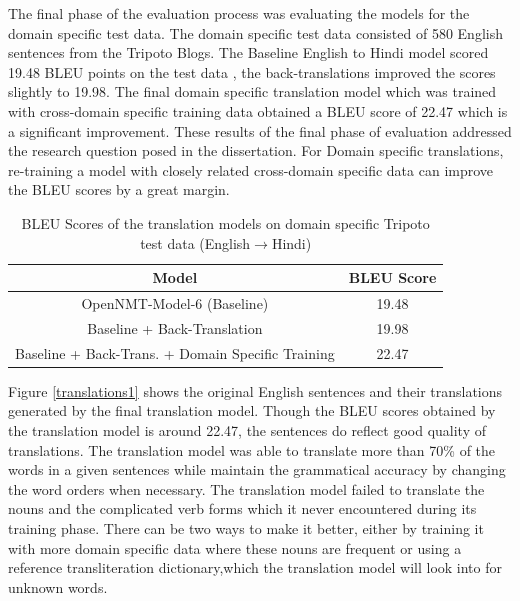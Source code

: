 The final phase of the evaluation process was evaluating the models for the domain specific test data. The domain specific test data consisted of 580 English sentences from the Tripoto Blogs. The Baseline English to Hindi model scored 19.48 BLEU points on the test data , the back-translations improved the scores slightly to 19.98. The final domain specific translation model which was trained with cross-domain specific training data obtained a BLEU score of 22.47 which is a significant improvement. These results of the final phase of evaluation addressed the research question posed in the dissertation. For Domain specific translations, re-training a model with closely related cross-domain specific data can improve the BLEU scores by a great margin. 
\begin{table}[h!]
\centering
 \begin{tabular}{ |c|c| } 
  \hline Model & BLEU Score  \\ 
  \hline  OpenNMT-Model-6 (Baseline) &   19.48\\
  Baseline + Back-Translation & 19.98\\
  Baseline + Back-Trans. + Domain Specific Training & 22.47 \\
  \hline
 \end{tabular}
\caption{BLEU Scores of the translation models on domain specific Tripoto test data (English$\rightarrow$Hindi)}
\label{bleutable3}
\end{table}

Figure \ref{translations1} shows the original English sentences and their translations generated by the final translation model. Though the BLEU scores obtained by the translation model is around 22.47, the sentences do reflect good quality of translations. The translation model was able to translate more than 70\% of the words in a given sentences while maintain the grammatical accuracy by changing the word orders when necessary. The translation model failed to translate the nouns and the complicated verb forms which it never encountered during its training phase. There can be two ways to make it better, either by training it with more domain specific data where these nouns are frequent or using a reference transliteration dictionary,which the translation model will look into for unknown words.

